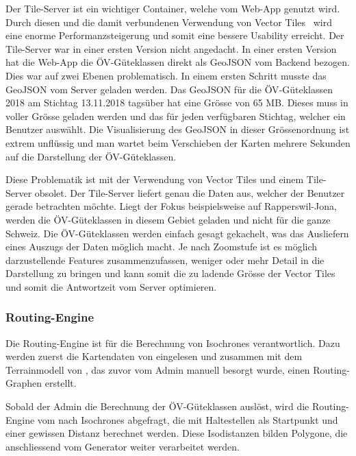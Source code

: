 Der Tile-Server ist ein wichtiger Container, welche vom Web-App genutzt wird.
Durch diesen und die damit verbundenen Verwendung von Vector Tiles~\cite{geometalab_vectortiles} wird eine enorme Performanzsteigerung und somit eine bessere Usability erreicht.
Der Tile-Server war in einer ersten Version nicht angedacht.
In einer ersten Version hat die Web-App die \acs{ÖV}-Güteklassen direkt als GeoJSON vom Backend bezogen.
Dies war auf zwei Ebenen problematisch.
In einem ersten Schritt musste das GeoJSON vom Server geladen werden.
Das GeoJSON für die \acs{ÖV}-Güteklassen 2018 am Stichtag 13.11.2018 tagsüber hat eine Grösse von 65 MB.
Dieses muss in voller Grösse geladen werden und das für jeden verfügbaren Stichtag, welcher ein Benutzer auswählt.
Die Visualisierung des GeoJSON in dieser Grössenordnung ist extrem unflüssig und man wartet beim Verschieben der Karten mehrere Sekunden auf die Darstellung der \acs{ÖV}-Güteklassen.

Diese Problematik ist mit der Verwendung von Vector Tiles und einem Tile-Server obsolet.
Der Tile-Server liefert genau die Daten aus, welcher der Benutzer gerade betrachten möchte.
Liegt der Fokus beispielsweise auf Rapperswil-Jona, werden die \acs{ÖV}-Güteklassen in diesem Gebiet geladen und nicht für die ganze Schweiz.
Die \acs{ÖV}-Güteklassen werden einfach gesagt gekachelt, was das Ausliefern eines Auszugs der Daten möglich macht.
Je nach Zoomstufe ist es möglich darzustellende Features zusammenzufassen, weniger oder mehr Detail in die Darstellung zu bringen und kann somit die zu ladende Grösse der Vector Tiles und somit die Antwortzeit vom Server optimieren.

\subsubsection{Routing-Engine}
\label{container:Routing-Engine}

Die Routing-Engine ist für die Berechnung von \glspl{Isochrone} verantwortlich.
Dazu werden zuerst die Kartendaten von  eingelesen und zusammen mit dem \gls{Terrainmodell} von , das zuvor vom Admin manuell besorgt wurde, einen Routing-Graphen erstellt.

Sobald der Admin die Berechnung der ÖV-Güteklassen auslöst, wird die Routing-Engine vom  nach \glspl{Isochrone} abgefragt, die mit Haltestellen als Startpunkt und einer gewissen Distanz berechnet werden.
Diese Isodistanzen bilden Polygone, die anschliessend vom Generator weiter verarbeitet werden.
